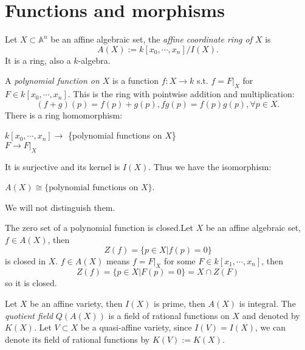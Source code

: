 \section{Functions and morphisms}
\begin{definition}
	Let $ X\subset \mathbb{A}^n $ be an affine algebraic set, the \textit{affine coordinate ring of $ X $} is
	\begin{equation}
		A(X):=k[x_0,\cdots,x_n]/I(X).
	\end{equation}
	It is a ring, also a $ k $-algebra.
\end{definition}
\begin{definition}
	A \textit{polynomial function on $ X $} is a function $ f:X\to k $ s.t. $ f=F|_X $ for $ F\in k[x_0,\cdots,x_n] $. This is the ring with pointwise addition and multiplication:
	$$
		(f+g)(p)=f(p)+g(p), fg(p)=f(p)g(p),\forall p\in X.
	$$
	There is a ring homomorphism:
	\begin{center}
		$ k[x_0,\cdots,x_n] \to $ \{polynomial functions on $ X $\}\\
		$ F\to F|_X $
	\end{center}
	It is surjective and its kernel is $ I(X) $. Thus we have the isomorphism:
	\begin{center}
		$ A(X)\cong \{ \text{polynomial functions on } X \} $.
	\end{center}
	We will not distinguish them.
\end{definition}
\begin{remark}
	The zero set of a polynomial function is closed.Let $ X $ be an affine algebraic set, $ f\in A(X) $, then
	\begin{equation}
		Z(f)=\{ p\in X|f(p)=0 \}
	\end{equation}
	is closed in $ X $. $ f\in A(X) $ means $ f=F|_X $ for some $ F\in k[x_1,\cdots,x_n] $, then
	\begin{equation}
		Z(f)=\{ p\in X|F(p)=0 \}=X\cap Z(F)
	\end{equation}
	so it is closed.
\end{remark}
\begin{definition}
	Let $ X $ be an affine variety, then $ I(X) $ is prime, then $ A(X) $ is integral.
	The \textit{quotient field} $ Q(A(X)) $ is a field of rational functions on $ X $ and denoted by $ K(X) $. Let $ V\subset X $ be a quasi-affine variety, since $ I(V)=I(X) $, we can denote its field of rational functions by $ K(V):=K(X) $.
\end{definition}
